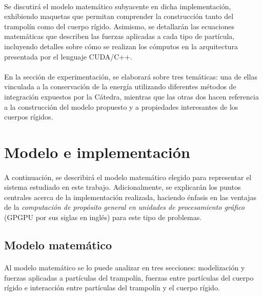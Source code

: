 \documentclass[12pt, twocolumn]{article}
\begin{document}
	\paragraph{} Se discutirá el modelo matemático subyacente en dicha implementación, exhibiendo maquetas que permitan comprender la construcción tanto del trampolín como del cuerpo rígido. Asimismo, se detallarán las ecuaciones matemáticas que describen las fuerzas aplicadas a cada tipo de partícula, incluyendo detalles sobre cómo se realizan los cómputos en la arquitectura presentada por el lenguaje CUDA/C++.
	
	\paragraph{} En la sección de experimentación, se elaborará sobre tres temáticas: una de ellas vinculada a la conservación de la energía utilizando diferentes métodos de integración expuestos por la Cátedra, mientras que las otras dos hacen referencia a la construcción del modelo propuesto y a propiedades interesantes de los cuerpos rígidos.
	
	\section{Modelo e implementación}
	
	\paragraph{} A continuación, se describirá el modelo matemático elegido para representar el sistema estudiado en este trabajo. Adicionalmente, se explicarán los puntos centrales acerca de la implementación realizada, haciendo énfasis en las ventajas de la \textit{computación de propósito general en unidades de procesamiento gráfico} (GPGPU por sus siglas en inglés) para este tipo de problemas.
	
	\subsection{Modelo matemático}
	
	\paragraph{} Al modelo matemático se lo puede analizar en tres secciones: modelización y fuerzas aplicadas a partículas del trampolín, fuerzas entre partículas del cuerpo rígido e interacción entre partículas del trampolín y el cuerpo rígido.
	
\end{document}
